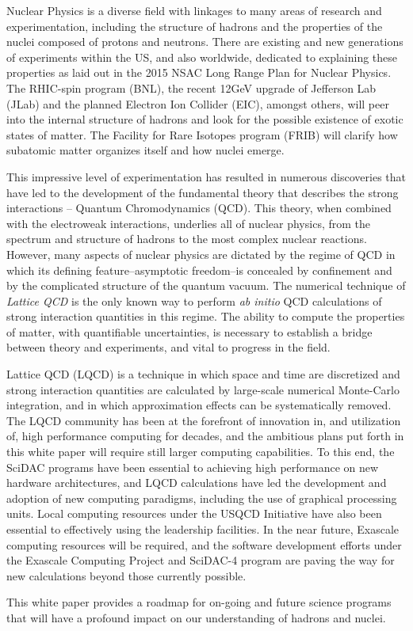 
Nuclear Physics is a diverse field with linkages to many areas of
research and experimentation, including the structure of  hadrons
and the properties of the nuclei composed of protons and neutrons.
There are existing and new generations of experiments within the US,
and also worldwide, dedicated to explaining these properties as laid
out in the 2015 NSAC Long Range Plan for Nuclear Physics.  The
RHIC-spin program (BNL), the recent
12GeV upgrade of Jefferson Lab (JLab) and the planned Electron Ion
Collider (EIC), amongst others, will peer into the internal structure of hadrons and
look for the possible existence of exotic states of matter. The
Facility for Rare Isotopes program (FRIB) will clarify how subatomic
matter organizes itself and how nuclei emerge.

This impressive level of experimentation has resulted in
numerous discoveries that have led to the development of the
fundamental theory that describes the strong interactions -- Quantum
Chromodynamics (QCD). This theory, when combined with the electroweak
interactions, underlies all of nuclear physics, from the spectrum and
structure of hadrons to the most complex nuclear reactions. However,
many aspects of nuclear physics are dictated by the regime of QCD in
which its defining feature--asymptotic freedom--is concealed by
confinement and by the complicated structure of the quantum
vacuum. The numerical technique of {\it Lattice QCD} is the only known
way to perform {\it ab initio} QCD calculations of strong interaction
quantities in this regime. The ability to compute the properties of
matter, with quantifiable uncertainties, is necessary to establish
a bridge between theory and experiments, and vital to progress in the
field.  

Lattice QCD (LQCD) is a technique in which space and time are
discretized and strong interaction quantities are calculated by
large-scale numerical Monte-Carlo integration, and in which
approximation effects can be systematically removed. The LQCD community
has been at the forefront of innovation in, and utilization of, high performance computing  for
decades, and the ambitious plans put forth in this white paper will
require still larger computing capabilities. To this end, the SciDAC
programs have been essential to achieving high performance on new hardware
architectures, and LQCD calculations have led the development and
adoption of new computing paradigms, including the use of graphical
processing units. Local computing resources under the USQCD Initiative
have also been essential to effectively using the
leadership facilities. In the near future, Exascale computing resources
will be required, and the software development efforts under the
Exascale Computing Project and SciDAC-4 program are paving the way for new calculations
beyond those currently possible.


This white paper provides a roadmap for on-going and future science
programs that will have a profound impact on our understanding of hadrons and nuclei.

